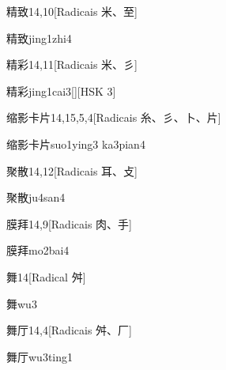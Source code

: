\begin{entry}{精致}{14,10}[Radicais ⽶、⾄]
  \begin{phonetics}{精致}{jing1zhi4}
  \end{phonetics}
\end{entry}

\begin{entry}{精彩}{14,11}[Radicais ⽶、⼺]
  \begin{phonetics}{精彩}{jing1cai3}[][HSK 3]
  \end{phonetics}
\end{entry}

\begin{entry}{缩影卡片}{14,15,5,4}[Radicais ⽷、⼺、⼘、⽚]
  \begin{phonetics}{缩影卡片}{suo1ying3 ka3pian4}
  \end{phonetics}
\end{entry}

\begin{entry}{聚散}{14,12}[Radicais ⽿、⽁]
  \begin{phonetics}{聚散}{ju4san4}
  \end{phonetics}
\end{entry}

\begin{entry}{膜拜}{14,9}[Radicais ⾁、⼿]
  \begin{phonetics}{膜拜}{mo2bai4}
  \end{phonetics}
\end{entry}

\begin{entry}{舞}{14}[Radical ⾇]
  \begin{phonetics}{舞}{wu3}
  \end{phonetics}
\end{entry}

\begin{entry}{舞厅}{14,4}[Radicais ⾇、⼚]
  \begin{phonetics}{舞厅}{wu3ting1}
  \end{phonetics}
\end{entry}


